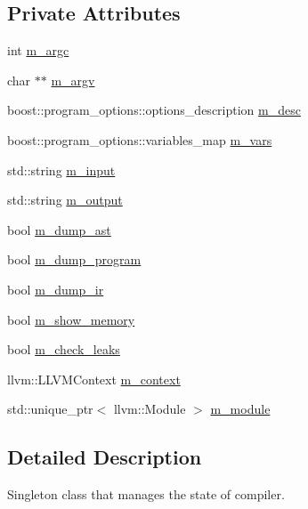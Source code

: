 \subsection*{Private Attributes}
\begin{DoxyCompactItemize}
\item 
int \hyperlink{classjawe_1_1control_a3e68b0df0786c7d69313e870f991d34a}{m\+\_\+argc}
\item 
char $\ast$$\ast$ \hyperlink{classjawe_1_1control_a1449ae95dcbd6fb6fee97bc28d38e246}{m\+\_\+argv}
\item 
boost\+::program\+\_\+options\+::options\+\_\+description \hyperlink{classjawe_1_1control_a7e86c44df163e1991167626e7e3e32d5}{m\+\_\+desc}
\item 
boost\+::program\+\_\+options\+::variables\+\_\+map \hyperlink{classjawe_1_1control_ada42ec370e2de6b2473e76efffaf25af}{m\+\_\+vars}
\item 
std\+::string \hyperlink{classjawe_1_1control_ad13652c476203209baef18476bb0ca8d}{m\+\_\+input}
\item 
std\+::string \hyperlink{classjawe_1_1control_a3847da990d053ee84fe7b66847e66cda}{m\+\_\+output}
\item 
bool \hyperlink{classjawe_1_1control_a993a9e6eff6a143ef985083c57ae267b}{m\+\_\+dump\+\_\+ast}
\item 
bool \hyperlink{classjawe_1_1control_acc4256916f57b4c8721fa24d8c15f3b5}{m\+\_\+dump\+\_\+program}
\item 
bool \hyperlink{classjawe_1_1control_a216a5071cb4effe06bc36216c61e55c1}{m\+\_\+dump\+\_\+ir}
\item 
bool \hyperlink{classjawe_1_1control_acaf44d403cbccc7d16f514c5c0dcceed}{m\+\_\+show\+\_\+memory}
\item 
bool \hyperlink{classjawe_1_1control_a91b200a38784da33881a0692925db04e}{m\+\_\+check\+\_\+leaks}
\item 
llvm\+::\+L\+L\+V\+M\+Context \hyperlink{classjawe_1_1control_aa996f999ce396f57e18448d06bd46a14}{m\+\_\+context}
\item 
std\+::unique\+\_\+ptr$<$ llvm\+::\+Module $>$ \hyperlink{classjawe_1_1control_a86b9aa016d912fd00d08bc1b9597839f}{m\+\_\+module}
\end{DoxyCompactItemize}


\subsection{Detailed Description}
Singleton class that manages the state of compiler. 

